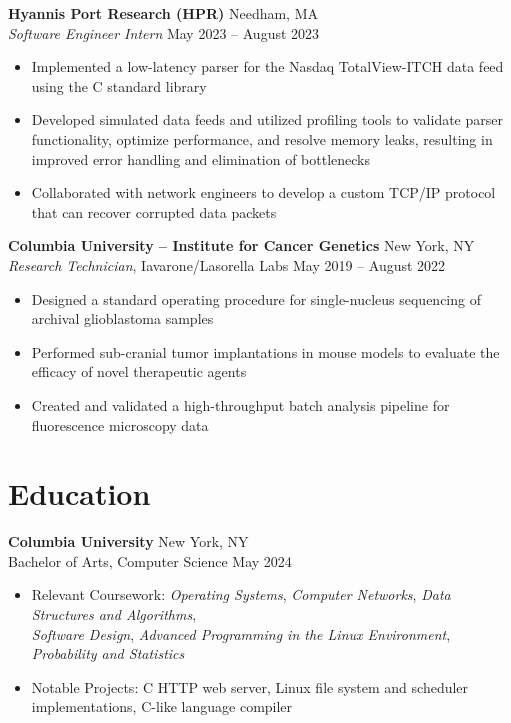 \documentclass[11pt,a4paper]{article}   %
\begin{document}
\textbf{Hyannis Port Research (HPR)} \hfill Needham, MA\\
\textit{Software Engineer Intern} \hfill May 2023 – August 2023
\begin{itemize}[noitemsep, topsep=2pt, partopsep=0pt, parsep=0pt]
  \item Implemented a low-latency parser for the Nasdaq TotalView-ITCH data feed using the C standard library
  \item Developed simulated data feeds and utilized profiling tools to validate parser functionality, optimize
    performance, and resolve memory leaks, resulting in improved error handling and elimination of bottlenecks
  \item Collaborated with network engineers to develop a custom TCP/IP protocol that can recover corrupted data packets
\end{itemize}
\vspace{0.2cm}

\textbf{Columbia University – Institute for Cancer Genetics} \hfill New York, NY\\
\textit{Research Technician}, Iavarone/Lasorella Labs \hfill May 2019 – August 2022 
\begin{itemize}[noitemsep, topsep=2pt, partopsep=0pt, parsep=0pt]
  \item Designed a standard operating procedure for single-nucleus sequencing of archival glioblastoma samples 
  \item Performed sub-cranial tumor implantations in mouse models to evaluate the efficacy of novel therapeutic agents
  \item Created and validated a high-throughput batch analysis pipeline for fluorescence microscopy data
\end{itemize}

\section*{Education}
\textbf{Columbia University} \hfill New York, NY\\
Bachelor of Arts, Computer Science \hfill May 2024

\begin{itemize}[noitemsep, topsep=2pt, partopsep=0pt, parsep=0pt]
  \item Relevant Coursework: 
    \textit{Operating Systems}, \textit{Computer Networks}, \textit{Data Structures and Algorithms},\\
    \textit{Software Design}, \textit{Advanced Programming in the Linux Environment}, \textit{Probability and Statistics}
  \item Notable Projects: C HTTP web server, Linux file system and scheduler implementations, C-like language compiler
\end{itemize}
\end{document}

